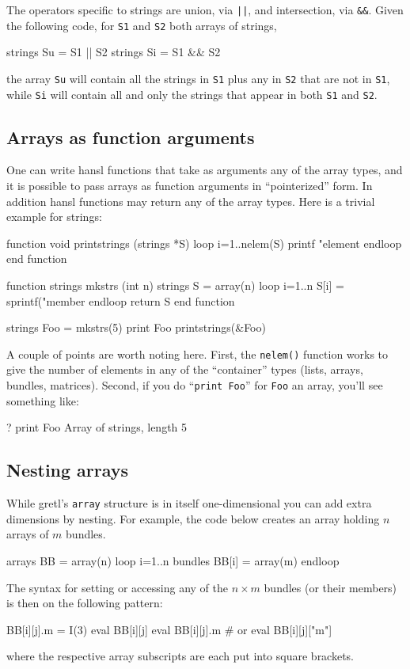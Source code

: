 The operators specific to strings are union, via \verb+||+, and
intersection, via \verb+&&+. Given the following code, for \texttt{S1}
and \texttt{S2} both arrays of strings,
\begin{code}
strings Su = S1 || S2
strings Si = S1 && S2
\end{code}
the array \texttt{Su} will contain all the strings in \texttt{S1} plus
any in \texttt{S2} that are not in \texttt{S1}, while \texttt{Si} will
contain all and only the strings that appear in both \texttt{S1} and
\texttt{S2}.

\subsection{Arrays as function arguments}
\label{subsec:array-args}

One can write hansl functions that take as arguments any of the array
types, and it is possible to pass arrays as function arguments in
``pointerized'' form. In addition hansl functions may return any of
the array types. Here is a trivial example for strings:
\begin{code}
function void printstrings (strings *S)
  loop i=1..nelem(S)
    printf "element %
  endloop
end function

function strings mkstrs (int n)
  strings S = array(n)
  loop i=1..n
    S[i] = sprintf("member %
  endloop
  return S
end function

strings Foo = mkstrs(5)
print Foo
printstrings(&Foo)
\end{code}

A couple of points are worth noting here. First, the \texttt{nelem()}
function works to give the number of elements in any of the
``container'' types (lists, arrays, bundles, matrices). Second, if you
do ``\texttt{print Foo}'' for \texttt{Foo} an array, you'll see
something like:
\begin{code}
? print Foo
Array of strings, length 5
\end{code}

\subsection{Nesting arrays}

While gretl's \texttt{array} structure is in itself one-dimensional
you can add extra dimensions by nesting. For example, the code below
creates an array holding $n$ arrays of $m$ bundles.
\begin{code}
arrays BB = array(n)
loop i=1..n
    bundles BB[i] = array(m)
endloop
\end{code}
The syntax for setting or accessing any of the $n \times m$ bundles
(or their members) is then on the following pattern:
\begin{code}
BB[i][j].m = I(3)
eval BB[i][j]
eval BB[i][j].m # or eval BB[i][j]["m"]
\end{code}
where the respective array subscripts are each put into square
brackets.

